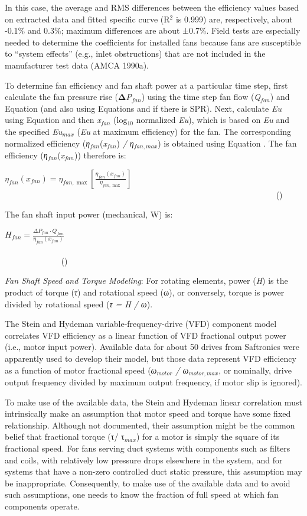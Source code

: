 In this case, the average and RMS differences between the efficiency values based on extracted data and fitted specific curve (R\(^{2}\) is 0.999) are, respectively, about -0.1\% and 0.3\%; maximum differences are about ±0.7\%. Field tests are especially needed to determine the coefficients for installed fans because fans are susceptible to ``system effects'' (e.g., inlet obstructions) that are not included in the manufacturer test data (AMCA 1990a).

To determine fan efficiency and fan shaft power at a particular time step, first calculate the fan pressure rise (\textbf{Δ}\emph{P\(_{fan}\)}) using the time step fan flow (\emph{Q\(_{fan}\)}) and Equation (and also using Equations and if there is SPR). Next, calculate \emph{Eu} using Equation and then \emph{x\(_{fan}\)} (log\(_{10}\) normalized \emph{Eu}), which is based on \emph{Eu} and the specified \emph{Eu\(_{max}\)} (\emph{Eu} at maximum efficiency) for the fan. The corresponding normalized efficiency (\emph{η\(_{fan}\)}(\emph{x\(_{fan}\)}) \emph{/ η\(_{fan,max}\)}) is obtained using Equation . The fan efficiency (\emph{η\(_{fan}\)}(\emph{x\(_{fan}\)})) therefore is:

\({\eta_{fan}}\left( {{x_{fan}}} \right) = {\eta_{fan,\max }}\left[ {\frac{{{\eta_{fan}}\left( {{x_{fan}}} \right)}}{{{\eta_{fan,\max }}}}} \right]\) ~~~~~~~~~~~~~~~~~~~~~~~~~~~~~~~~~~~~~~~~~~~~~~~~~~~~~~~~~~~~~~~~~ ()

The fan shaft input power (mechanical, W) is:

\({H_{fan}} = \frac{{\Delta {P_{fan}} \cdot {Q_{fan}}}}{{{\eta_{fan}}\left( {{x_{fan}}} \right)}}\) ~~~~~~~~~~~~~~~~~~~~~~~~~~~~~~~~~~~~~~~~~~~~~~~~~~~~~~~~~~~~~~~~~~~~~~~~~~~~~~~~~~~~~ ()

\emph{Fan Shaft Speed and Torque Modeling}: For rotating elements, power (\emph{H}) is the product of torque (\emph{τ}) and rotational speed (ω), or conversely, torque is power divided by rotational speed (\emph{τ = H / ω}).

The Stein and Hydeman variable-frequency-drive (VFD) component model correlates VFD efficiency as a linear function of VFD fractional output power (i.e., motor input power). Available data for about 50 drives from Saftronics were apparently used to develop their model, but those data represent VFD efficiency as a function of motor fractional speed (\emph{ω\(_{motor}\) / ω\(_{motor,max}\)}, or nominally, drive output frequency divided by maximum output frequency, if motor slip is ignored).

To make use of the available data, the Stein and Hydeman linear correlation must intrinsically make an assumption that motor speed and torque have some fixed relationship. Although not documented, their assumption might be the common belief that fractional torque (τ/ τ\(_{max}\)) for a motor is simply the square of its fractional speed. For fans serving duct systems with components such as filters and coils, with relatively low pressure drops elsewhere in the system, and for systems that have a non-zero controlled duct static pressure, this assumption may be inappropriate. Consequently, to make use of the available data and to avoid such assumptions, one needs to know the fraction of full speed at which fan components operate.

